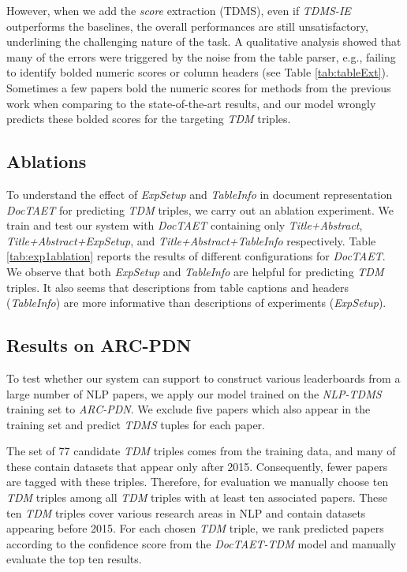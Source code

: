 \documentclass[11pt,a4paper]{article}
\begin{document}
However, when we add the \textit{score} extraction (TDMS), even if \emph{TDMS-IE} outperforms the baselines, the overall performances are still unsatisfactory, underlining the challenging nature of the task. A qualitative analysis showed that many of the errors were triggered by the noise from the table parser, e.g., failing to identify bolded numeric scores or column headers (see Table \ref{tab:tableExt}). Sometimes a few papers bold the numeric scores for methods from the previous work when comparing to the state-of-the-art results, and our model wrongly predicts these bolded scores for the targeting \emph{TDM} triples.








\subsection{Ablations}\label{sec:nlptdes_ablation}
To understand the effect of \emph{ExpSetup} and \emph{TableInfo} in 
document representation \emph{DocTAET} for predicting \emph{TDM} triples, we carry out an ablation experiment. We train and test our system with \emph{DocTAET} containing only \emph{Title+Abstract}, \emph{Title+Abstract+ExpSetup}, and \emph{Title+Abstract+TableInfo} respectively.
Table \ref{tab:exp1ablation} reports the results of different configurations for \emph{DocTAET}.
We observe that both \emph{ExpSetup} and \emph{TableInfo} are helpful for predicting 
\emph{TDM} triples. It also seems that descriptions from table captions and headers (\emph{TableInfo}) are more informative than descriptions of experiments (\emph{ExpSetup}).


\subsection{Results on ARC-PDN}\label{sec:aclanth_results}
To test whether our system can support to construct various leaderboards from a large number of NLP papers, we apply our model trained on the \emph{NLP-TDMS} training set to \emph{ARC-PDN}. We exclude five papers which also appear in the training set and predict \emph{TDMS} tuples for each paper. 

The set of 77 candidate \emph{TDM} triples comes from the training data, and many of these contain datasets that appear only after 2015.
Consequently, fewer papers are tagged with these triples. 
Therefore, for evaluation we manually choose ten \emph{TDM} triples among all \emph{TDM} triples with at least ten associated papers. These ten \emph{TDM} triples cover various research areas in NLP and contain datasets appearing before 2015. For each chosen \emph{TDM} triple, we rank predicted papers according to the confidence score from the \emph{DocTAET-TDM} model and manually evaluate the top ten results. 
\end{document}
